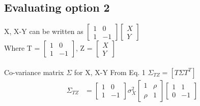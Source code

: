 \documentclass[journal,12pt,twocolumn]{IEEEtran}
\begin{document}
\begin{enumerate}[label=\arabic*.,ref=\theenumi]
\subsection{Evaluating option 2}
X, X-Y can be written as
$\begin{bmatrix}
   1   &   0\\
   1   &   -1
\end{bmatrix}
\begin{bmatrix}
   X \\
   Y
\end{bmatrix}$\\
Where T = $\begin{bmatrix}
   1   &   0\\
   1   &   -1
\end{bmatrix}$, Z = $\begin{bmatrix}
   X \\
   Y
\end{bmatrix}$\\
\\
Co-variance matrix $\Sigma$ for X, X-Y
From Eq. 1 $\Sigma_{TZ} = [T\Sigma T^T]$
\begin{align*}
    \Sigma_{TZ} &= \begin{bmatrix}
   1   &   0\\
   1   &   -1
\end{bmatrix} \sigma_X^2 
\begin{bmatrix}
   1    & \rho \\
   \rho &  1 
\end{bmatrix}
\begin{bmatrix}
   1   &   1\\
   0   &   -1
\end{bmatrix}
\end{align*}



\end{enumerate}
\end{document}
